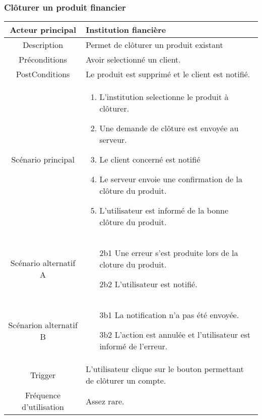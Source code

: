 \documentclass{article}
\begin{document}
\newpage

\subsubsection{Clôturer un produit financier}
\begin{table}[h]
   \begin{tabular}{|c|p{10cm}|}
      \hline
      Acteur principal&Institution fiancière\\
      \hline
      Description&Permet de clôturer un produit existant\\
      \hline
      Préconditions&Avoir selectionné un client.\\
      \hline
      PostConditions&Le produit est supprimé et le client est notifié.\\
      \hline
      Scénario principal& 
            \begin{enumerate}
               \item L'institution selectionne le produit à clôturer.
               \item Une demande de clôture est envoyée au serveur.
               \item Le client concerné est notifié
               \item Le serveur envoie une confirmation de la clôture du produit.
               \item L'utilisateur est informé de la bonne clôture du produit.
            \end{enumerate}     \\
      \hline
      Scénario alternatif A&
            \begin{itemize}
               \item[2b1] Une erreur s'est produite lors de la cloture du produit.
               \item[2b2] L'utilisateur est notifié. 
            \end{itemize}\\
      \hline
      Scénarion alternatif B&
            \begin{itemize}
               \item[3b1] La notification n'a pas été envoyée.
               \item[3b2] L'action est annulée et l'utilisateur est informé de l'erreur.  
            \end{itemize}\\
      \hline
      Trigger&L'utilisateur clique sur le bouton permettant de clôturer un compte.\\
      \hline
      Fréquence d'utilisation&Assez rare.\\
      \hline
   \end{tabular}
\end{table}
\end{document}
